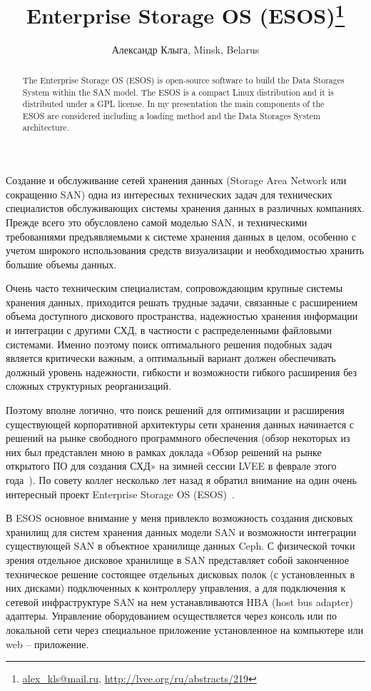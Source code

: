 \documentclass[10pt, a5paper]{article}
\begin{document}
\title{Enterprise Storage OS (ESOS)\footnote{\url{alex_kls@mail.ru}, \url{http://lvee.org/ru/abstracts/219}}}
\author{Александр Клыга, Minsk, Belarus}
\maketitle
\begin{abstract}
The Enterprise Storage OS (ESOS) is open-source software to build the Data Storages System within the SAN model. The ESOS is a compact Linux distribution and it is distributed under a GPL license. In my presentation the main components of the ESOS are considered including a loading method and the Data Storages System architecture.
\end{abstract}

Создание и обслуживание сетей хранения данных (Storage Area Network или сокращенно SAN) одна из интересных технических задач для технических специалистов обслуживающих системы хранения данных в различных компаниях. Прежде всего это обусловлено самой моделью SAN, и техническими требованиями предъявляемыми к системе хранения данных в целом, особенно с учетом широкого использования средств визуализации и необходимостью хранить большие объемы данных.

Очень часто техническим специалистам, сопровождающим крупные системы хранения данных, приходится решать трудные задачи, связанные с расширением объема доступного дискового пространства, надежностью хранения информации и интеграции с другими СХД, в частности с распределенными файловыми системами. Именно поэтому поиск оптимального решения подобных задач является критически важным, а оптимальный вариант должен обеспечивать должный уровень надежности, гибкости и возможности гибкого расширения без сложных структурных реорганизаций.

Поэтому вполне логично, что поиск решений для оптимизации и расширения существующей корпоративной архитектуры сети хранения данных начинается с решений на рынке свободного программного обеспечения (обзор некоторых из них был представлен мною в рамках доклада «Обзор решений на рынке открытого ПО для создания СХД» на зимней сессии LVEE в феврале этого года~\cite{Kliga1}). По совету коллег несколько лет назад я обратил внимание на один очень интересный проект  Enterprise Storage OS (ESOS)~\cite{Kliga2}.

В ESOS основное внимание у меня привлекло возможность создания дисковых хранилищ для систем хранения данных модели SAN и возможности интеграции существующей SAN в объектное хранилище данных Ceph. 
С физической точки зрения отдельное дисковое хранилище в SAN представляет собой законченное техническое решение состоящее отдельных дисковых полок (с установленных в них дисками)  подключенных к контроллеру управления, а для подключения к сетевой инфраструктуре SAN  на нем устанавливаются HBA (host bus adapter) адаптеры. Управление оборудованием осуществляется через консоль или по локальной сети \linebreak через специальное приложение установленное на компьютере или web – приложение.
\end{document}
